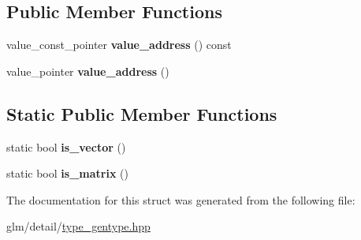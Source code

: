 \subsection*{Public Member Functions}
\begin{DoxyCompactItemize}
\item 
\hypertarget{structglm_1_1detail_1_1genType_a63fb77e77082f34c0a0d7faa0906f7f4}{value\-\_\-const\-\_\-pointer {\bfseries value\-\_\-address} () const }\label{structglm_1_1detail_1_1genType_a63fb77e77082f34c0a0d7faa0906f7f4}

\item 
\hypertarget{structglm_1_1detail_1_1genType_a146973ec142766743080c1895a9e3c65}{value\-\_\-pointer {\bfseries value\-\_\-address} ()}\label{structglm_1_1detail_1_1genType_a146973ec142766743080c1895a9e3c65}

\end{DoxyCompactItemize}
\subsection*{Static Public Member Functions}
\begin{DoxyCompactItemize}
\item 
\hypertarget{structglm_1_1detail_1_1genType_ae83087df55201bdc46a37decf3d1c34c}{static bool {\bfseries is\-\_\-vector} ()}\label{structglm_1_1detail_1_1genType_ae83087df55201bdc46a37decf3d1c34c}

\item 
\hypertarget{structglm_1_1detail_1_1genType_a78c650375558d5e2ccfba383cdb59479}{static bool {\bfseries is\-\_\-matrix} ()}\label{structglm_1_1detail_1_1genType_a78c650375558d5e2ccfba383cdb59479}

\end{DoxyCompactItemize}


The documentation for this struct was generated from the following file\-:\begin{DoxyCompactItemize}
\item 
glm/detail/\hyperlink{type__gentype_8hpp}{type\-\_\-gentype.\-hpp}\end{DoxyCompactItemize}
